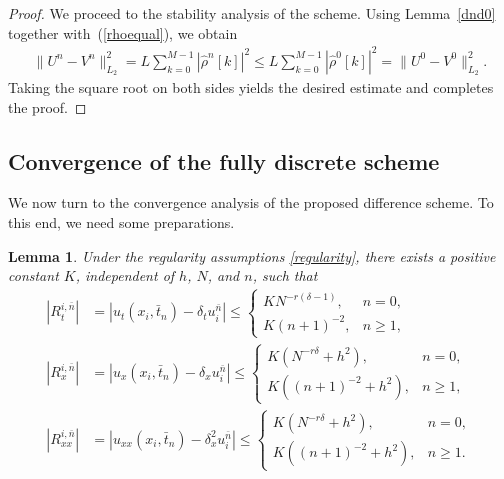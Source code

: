 \documentclass[10pt, reqno]{amsart}
\newtheorem{lmm}{\bf Lemma}
\newenvironment{lemma}{\begin{lmm}}{\end{lmm}}
\theoremstyle{remark}
\theoremstyle{definition}
\numberwithin{table}{section}
\begin{document}
\begin{proof}
    We proceed to the stability analysis of the scheme. Using Lemma~\ref{dnd0} together with~(\ref{rhoequal}), we obtain
    \begin{equation*}
\begin{aligned}
\|U^n-V^n\|_{L_2}^2 =L\sum_{k=0}^{M-1}|\hat{\rho}^n[k]|^2 \leq L\sum_{k=0}^{M-1}|\hat{\rho}^0[k]|^2=\|U^0-V^0\|_{L_2}^2.
\end{aligned}
\end{equation*}
Taking the square root on both sides yields the desired estimate and completes the proof.
\end{proof}

\subsection{Convergence of the fully discrete scheme}\label{secconvergen}
We now turn to the convergence analysis of the proposed difference scheme. To this end, we need some preparations.
\begin{lemma} \label{second}
Under the regularity assumptions \eqref{regularity}, 
there exists a positive constant $K$, independent of $h$, $N$, and $n$, such that
\begin{equation}\label{spaceerror}
    \begin{aligned}
    |R_t^{i, \bar{n}}| &= |u_t(x_i,  \bar{t}_n) -{\delta}_t u_i^{\bar{n}}| \leq \begin{cases} 
        KN^{-r(\delta-1)},&n=0,\\
        K(n+1)^{-2}, &n\geq 1,
        \end{cases}\\
    |R_x^{i, \bar{n}}|&=|u_x(x_i, \bar{t}_n)-{\delta}_x u_i^{\bar{n}}|\leq \begin{cases} 
        K(N^{-r\delta}+h^2),&n=0,\\
        K((n+1)^{-2}+h^2), &n\geq 1,
        \end{cases}\\
     |R_{xx}^{i, \bar{n}}|&=|u_{xx}(x_i, \bar{t}_n)-\delta_x^2u_i^{\bar{n}}|\leq \begin{cases} 
        K(N^{-r\delta}+h^2),&n=0,\\
        K((n+1)^{-2}+h^2), &n\geq 1.
        \end{cases}
    \end{aligned}
\end{equation}
\end{lemma}
\end{document}
